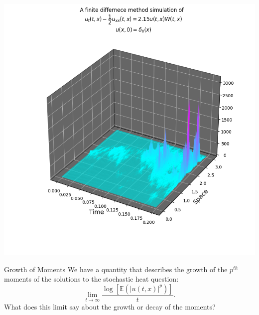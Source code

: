 \documentclass{beamer}%
\numberwithin{equation}{section}
\begin{document}
	\begin{frame}
		\centering
		\includegraphics[scale=.5]{SHEdeltaNoise2.15.png}
	\end{frame}
	
	\begin{frame}[t]{Growth of Moments}
		We have a quantity that describes the growth of the $p^{th}$ moments of the solutions to the stochastic heat question:
		\[
		\lim_{t \to \infty} \frac{\log\left[\mathbb{E}(|u(t,x)|^p)\right]}{t}.
		\]
		What does this limit say about the growth or decay of the moments? 
		
	\end{frame}
	
\end{document}
